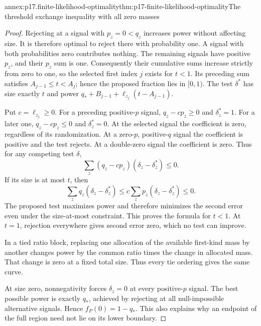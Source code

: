 \begin{annexitem}{annex:p17.finite-likelihood-optimality}{thm:p17-finite-likelihood-optimality}{The threshold exchange inequality with all zero masses}
\begin{proof}
Rejecting at a signal with \(p_z=0<q_z\) increases power without affecting
size. It is therefore optimal to reject there with probability one.
A signal with both probabilities zero contributes nothing.
The remaining signals have positive \(p_z\), and their \(p_z\) sum is one.
Consequently their cumulative sums increase strictly from zero to one,
so the selected first index \(j\) exists for \(t<1\).
Its preceding sum satisfies \(A_{j-1}\leq t<A_j\); hence the proposed
fraction lies in \([0,1)\). The test \(\delta^*\) has size exactly \(t\)
and power \(q_*+B_{j-1}+\ell_{z_j}(t-A_{j-1})\).

Put \(c=\ell_{z_j}\geq0\). For a preceding positive-\(p\) signal,
\(q_z-cp_z\geq0\) and \(\delta_z^*=1\).
For a later one, \(q_z-cp_z\leq0\) and \(\delta_z^*=0\).
At the selected signal the coefficient is zero, regardless of its
randomization. At a zero-\(p\), positive-\(q\) signal the coefficient
is positive and the test rejects. At a double-zero signal the coefficient
is zero. Thus for any competing test \(\delta\),
\[
                        \sum_z(q_z-cp_z)(\delta_z-\delta_z^*)\leq0.
\]
If its size is at most \(t\), then
\[
 \sum_zq_z(\delta_z-\delta_z^*)
   \leq c\sum_zp_z(\delta_z-\delta_z^*)\leq0.
\]
The proposed test maximizes power and therefore minimizes the second
error even under the size-at-most constraint. This proves the formula
for \(t<1\). At \(t=1\), rejection everywhere gives second error zero,
which no test can improve.

In a tied ratio block, replacing one allocation of the available
first-kind mass by another changes power by the common ratio times the
change in allocated mass. That change is zero at a fixed total size.
Thus every tie ordering gives the same curve.

At size zero, nonnegativity forces \(\delta_z=0\) at every positive-\(p\)
signal. The best possible power is exactly \(q_*\), achieved by rejecting
at all null-impossible alternative signals. Hence \(f_P(0)=1-q_*\).
This also explains why an endpoint of the full region need not lie
on its lower boundary.
\end{proof}
\end{annexitem}

